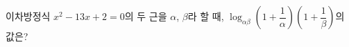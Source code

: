 이차방정식 $x^2-13x+2=0$의 두 근을 $\alpha$, $\beta$라 할 때, $\log_{\alpha\beta}\left(1+\dfrac{1}{\alpha}\right)\left(1+\dfrac{1}{\beta}\right)$의 값은?
